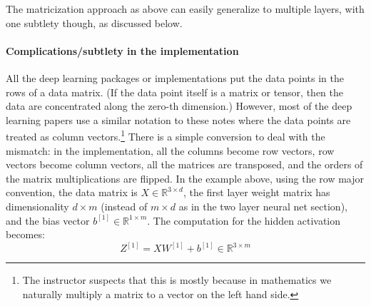 The matricization approach as above can easily generalize to multiple
layers, with one subtlety though, as discussed below.

\paragraph{Complications/subtlety in the implementation} All the deep learning
packages or implementations put the data points in the rows of a data
matrix. (If the data point itself is a matrix or tensor, then the data are
concentrated along the zero-th dimension.) However, most of the deep learning
papers use a similar notation to these notes where the data points are treated
as column vectors.\footnote{
The instructor suspects that this is mostly because in mathematics we naturally multiply
a matrix to a vector on the left hand side.} There is a simple conversion to deal with the mismatch:
in the implementation, all the columns become row vectors, row vectors become
column vectors, all the matrices are transposed, and the orders of the
matrix multiplications are flipped. In the example above, using the row major
convention, the data matrix is $X \in \mathbb{R}^{3 \times d}$, the first layer weight matrix
has dimensionality $d \times m$ (instead of $m \times d$ as in the two layer neural net
section), and the bias vector $b^{[1]} \in \mathbb{R}^{1 \times m}$. The computation for the hidden
activation becomes:
\begin{equation}
    Z^{[1]} = X W^{[1]} + b^{[1]} \in \mathbb{R}^{3 \times m}
\end{equation}
